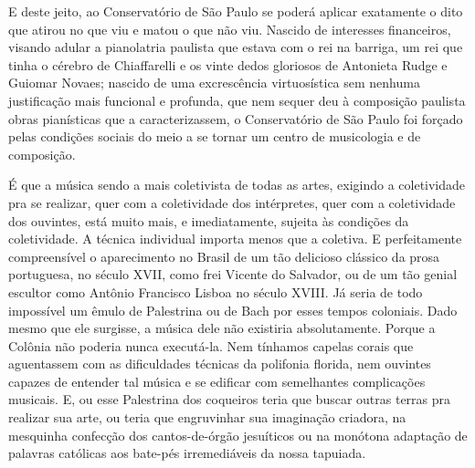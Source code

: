 E deste jeito, ao Conservatório de São Paulo se poderá aplicar
exatamente o dito que atirou no que viu e matou o que não viu. Nascido
de interesses financeiros, visando adular a pianolatria paulista que
estava com o rei na barriga, um rei que tinha o cérebro de Chiaffarelli
e os vinte dedos gloriosos de Antonieta Rudge e Guiomar Novaes; nascido
de uma excrescência virtuosística sem nenhuma justificação mais
funcional e profunda, que nem sequer deu à composição paulista obras
pianísticas que a caracterizassem, o Conservatório de São Paulo foi
forçado pelas condições sociais do meio a se tornar um centro de
musicologia e de composição.

É que a música sendo a mais coletivista de todas as artes, exigindo a
coletividade pra se realizar, quer com a coletividade dos intérpretes,
quer com a coletividade dos ouvintes, está muito mais, e imediatamente,
sujeita às condições da coletividade. A técnica individual importa menos
que a coletiva. E perfeitamente compreensível o aparecimento no Brasil
de um tão delicioso clássico da prosa portuguesa, no século XVII, como
frei Vicente do Salvador, ou de um tão genial escultor como Antônio
Francisco Lisboa no século XVIII. Já seria de todo impossível um êmulo
de Palestrina ou de Bach por esses tempos coloniais. Dado mesmo que ele
surgisse, a música dele não existiria absolutamente. Porque a Colônia
não poderia nunca executá-la. Nem tínhamos capelas corais que
aguentassem com as dificuldades técnicas da polifonia florida, nem
ouvintes capazes de entender tal música e se edificar com semelhantes
complicações musicais. E, ou esse Palestrina dos coqueiros teria que
buscar outras terras pra realizar sua arte, ou teria que engruvinhar sua
imaginação criadora, na mesquinha confecção dos cantos-de-órgão
jesuíticos ou na monótona adaptação de palavras católicas aos bate-pés
irremediáveis da nossa tapuiada.

